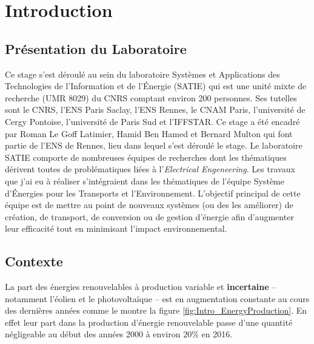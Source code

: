 \documentclass[12pt, french]{report}
\begin{document}
\tableofcontents

\printnomenclature

\chapter{Introduction}
\section{Présentation du Laboratoire}
Ce stage s'est déroulé au sein du laboratoire Systèmes et Applications des Technologies de l'Information et de l'Énergie (SATIE) qui est une unité mixte de recherche (UMR 8029) du CNRS comptant environ 200 personnes. Ses tutelles sont le CNRS, l'ENS Paris Saclay, l'ENS Rennes, le CNAM Paris, l'université de Cergy Pontoise, l'université de Paris Sud et l'IFFSTAR. Ce stage a été encadré par Roman Le Goff Latimier, Hamid Ben Hamed et Bernard Multon qui font partie de l'ENS de Rennes, lieu dans lequel s'est déroulé le stage. Le laboratoire SATIE comporte de nombreuses équipes de recherches dont les thématiques dérivent toutes de problématiques liées à l'\textit{Electrical Engeneering}. Les travaux que j'ai eu à réaliser s'intégraient dans les thématiques de l'équipe Système d'Énergies pour les Transports et l'Environnement. L'objectif principal de cette équipe est de mettre au point de nouveaux systèmes (ou des les améliorer) de création, de transport, de conversion ou de gestion d'énergie afin d'augmenter leur efficacité tout en minimisant l'impact environnemental.


\section{Contexte}

La part des énergies renouvelables à production variable et \textbf{incertaine} -- notamment l'éolien et le photovoltaïque -- est en augmentation constante au cours des dernières années comme le montre la figure \ref{fig:Intro_EnergyProduction}. En effet leur part dans la production d'énergie renouvelable passe d'une quantité négligeable au début des années 2000 à environ $20 \%$ en 2016.
\end{document}
